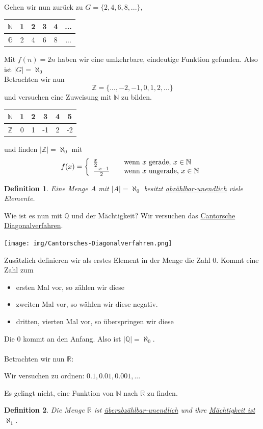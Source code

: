 \documentclass{report}
\newtheorem{mydef}{Definition}
\begin{document}
Gehen wir nun zurück zu $G = \{2, 4, 6, 8, ...\}$,
\begin{center}\begin{tabular}{c | c | c | c | c | c}$\mathbb{N}$ & 1 & 2 & 3 & 4 & ...\\ \hline
$\mathbb{G}$ & 2 & 4 & 6 & 8 & ...\end{tabular}\end{center}
Mit $f(n) = 2n$ haben wir eine umkehrbare, eindeutige Funktion gefunden. Also ist $|G| = \aleph_0$\\
Betrachten wir nun
\begin{equation}\mathbb{Z} = \{..., -2, -1, 0, 1, 2, ...\}\end{equation}
und versuchen eine Zuweisung mit $\mathbb{N}$ zu bilden.
\begin{center}\begin{tabular}{c | c | c | c | c | c}$\mathbb{N}$ & 1 & 2 & 3 & 4 & 5\\ \hline
$\mathbb{Z}$ & 0 & 1 & -1 & 2 & -2\end{tabular}\end{center}
und finden $|\mathbb{Z}| = \aleph_0$ mit
\[f(x) = \left\{ 
\begin{array}{l l}
  \frac{x}{2} & \quad \mbox{wenn $x$ gerade, $x \in \mathbb{N}$}\\
  \frac{-x-1}{2} & \quad \mbox{wenn $x$ ungerade, $x \in \mathbb{N}$}\\ \end{array} \right. \]
\begin{mydef}Eine Menge $A$ mit $|A| = \aleph_0$ besitzt \underline{abzählbar-unendlich} viele Elemente.\end{mydef}
Wie ist es nun mit $\mathbb{Q}$ und der Mächtigkeit? Wir versuchen das \underline{Cantorsche Diagonalverfahren}.
\begin{center}\texttt{[image: img/Cantorsches-Diagonalverfahren.png]}\end{center}
Zusätzlich definieren wir als erstes Element in der Menge die Zahl 0. Kommt eine Zahl zum
\begin{itemize}
\item ersten Mal vor, so zählen wir diese
\item zweiten Mal vor, so wählen wir diese negativ.
\item dritten, vierten Mal vor, so überspringen wir diese\end{itemize}
Die 0 kommt an den Anfang. Also ist $|\mathbb{Q}| = \aleph_0$.\\\\
Betrachten wir nun $\mathbb{R}$:
\begin{center}Wir versuchen zu ordnen: $0.1, 0.01, 0.001, ...$\end{center}
Es gelingt nicht, eine Funktion von $\mathbb{N}$ nach $\mathbb{R}$ zu finden.
\begin{mydef}Die Menge $\mathbb{R}$ ist \underline{überabzählbar-unendlich} und ihre \underline{Mächtigkeit ist $\aleph_1$}.\end{mydef}
\end{document}
